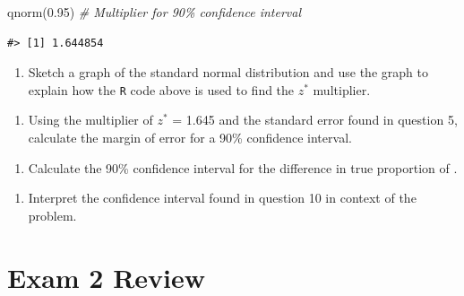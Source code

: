 \documentclass[
]{report}
\newenvironment{Shaded}{\begin{snugshade}}{\end{snugshade}}
\newcommand{\CommentTok}[1]{\textcolor[rgb]{0.56,0.35,0.01}{\textit{#1}}}
\newcommand{\FloatTok}[1]{\textcolor[rgb]{0.00,0.00,0.81}{#1}}
\newcommand{\FunctionTok}[1]{\textcolor[rgb]{0.00,0.00,0.00}{#1}}
\newcommand{\NormalTok}[1]{#1}
\providecommand{\tightlist}{%
  \setlength{\itemsep}{0pt}\setlength{\parskip}{0pt}}
\begin{document}
\begin{Shaded}
\begin{Highlighting}[]
\FunctionTok{qnorm}\NormalTok{(}\FloatTok{0.95}\NormalTok{) }\CommentTok{\# Multiplier for 90\% confidence interval}
\end{Highlighting}
\end{Shaded}

\begin{verbatim}
#> [1] 1.644854
\end{verbatim}

\begin{enumerate}
\def\labelenumi{\arabic{enumi}.}
\setcounter{enumi}{7}
\tightlist
\item
  Sketch a graph of the standard normal distribution and use the graph to explain how the \texttt{R} code above is used to find the \(z^*\) multiplier.
\end{enumerate}

\vspace{1.5in}

\begin{enumerate}
\def\labelenumi{\arabic{enumi}.}
\setcounter{enumi}{8}
\tightlist
\item
  Using the multiplier of \(z^*\) = 1.645 and the standard error found in question 5, calculate the margin of error for a 90\% confidence interval.
\end{enumerate}

\vspace{0.5in}

\begin{enumerate}
\def\labelenumi{\arabic{enumi}.}
\setcounter{enumi}{9}
\tightlist
\item
  Calculate the 90\% confidence interval for the difference in true proportion of .
\end{enumerate}

\vspace{1in}

\begin{enumerate}
\def\labelenumi{\arabic{enumi}.}
\setcounter{enumi}{10}
\tightlist
\item
  Interpret the confidence interval found in question 10 in context of the problem.
\end{enumerate}

\vspace{1in}

\hypertarget{exam-2-review}{%
\chapter{Exam 2 Review}\label{exam-2-review}}
\end{document}
